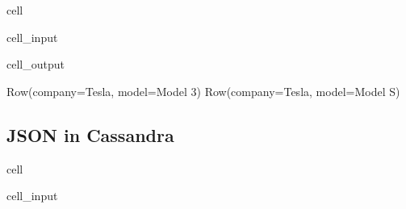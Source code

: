\documentclass[letterpaper,10pt,english]{jupyterBook}
\begin{document}
\begin{sphinxuseclass}{cell}\begin{sphinxVerbatimInput}

\begin{sphinxuseclass}{cell_input}
\begin{sphinxVerbatim}[commandchars=\\\{\}]
  
   \PYG{p}{[}\PYG{p}{]}
   
\end{sphinxVerbatim}

\end{sphinxuseclass}\end{sphinxVerbatimInput}
\begin{sphinxVerbatimOutput}

\begin{sphinxuseclass}{cell_output}
\begin{sphinxVerbatim}[commandchars=\\\{\}]
Row(company=\PYGZsq{}Tesla\PYGZsq{}, model=\PYGZsq{}Model 3\PYGZsq{})
Row(company=\PYGZsq{}Tesla\PYGZsq{}, model=\PYGZsq{}Model S\PYGZsq{})
\end{sphinxVerbatim}

\end{sphinxuseclass}\end{sphinxVerbatimOutput}

\end{sphinxuseclass}

\subsection{JSON in Cassandra}
\label{\detokenize{2_Data_sources/Databases/Cassandra:json-in-cassandra}}
\begin{sphinxuseclass}{cell}\begin{sphinxVerbatimInput}

\begin{sphinxuseclass}{cell_input}
\begin{sphinxVerbatim}[commandchars=\\\{\}]
   
 
 
\end{sphinxVerbatim}

\end{sphinxuseclass}\end{sphinxVerbatimInput}

\end{sphinxuseclass}
\end{document}
